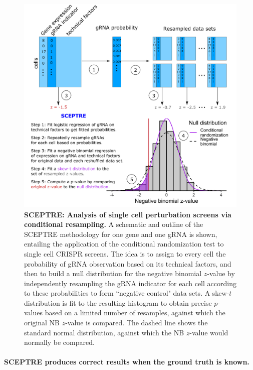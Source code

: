 \documentclass{nature}
\begin{document}
\thispagestyle{empty}
\begin{figure}[h!]
	\includegraphics[width = \textwidth]{figures/Figure2/Figure2.png}
	\caption{\textbf{SCEPTRE: Analysis of single cell perturbation screens via conditional resampling.} A schematic and outline of the SCEPTRE methodology for one gene and one gRNA is shown, entailing the application of the conditional randomization test\cite{CetL16} to single cell CRISPR screens. The idea is to assign to every cell the probability of gRNA observation based on its technical factors, and then to build a null distribution for the negative binomial $z$-value by independently resampling the gRNA indicator for each cell according to these probabilities to form ``negative control" data sets. A skew-$t$ distribution is fit to the resulting histogram to obtain precise $p$-values based on a limited number of resamples, against which the original NB $z$-value is compared. The dashed line shows the standard normal distribution, against which the NB $z$-value would normally be compared.}
	\label{fig:method}
\end{figure}

\paragraph{SCEPTRE produces correct results when the ground truth is known.} 
\end{document}
